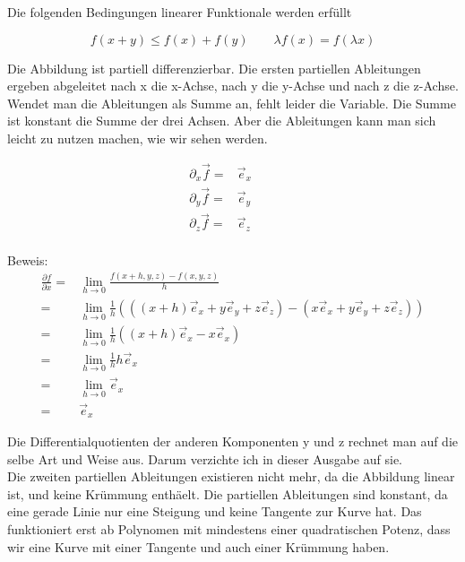 \documentclass[a4paper]{article}
\begin{document}
Die folgenden Bedingungen linearer Funktionale werden erf\"ullt

\begin{displaymath}
    f(x + y) \leq f(x) + f(y)\qquad\lambda f(x) = f(\lambda x)
\end{displaymath}

Die Abbildung ist partiell differenzierbar. Die ersten partiellen Ableitungen ergeben abgeleitet nach x die x-Achse, nach y die y-Achse und nach z die z-Achse. Wendet man die Ableitungen als Summe an, fehlt leider die Variable. Die Summe ist konstant die Summe der drei Achsen. Aber die Ableitungen kann man sich leicht zu nutzen machen, wie wir sehen werden.


\begin{displaymath}
\begin{align}
\partial_{x}\vec{f} =& \vec{e}_{x}\qquad\\
\partial_{y}\vec{f} =& \vec{e}_{y}\qquad\\
\partial_{z}\vec{f} =& \vec{e}_{z}\qquad\\
\end{align}
\end{displaymath}

Beweis:\\

\begin{displaymath}
\begin{align}
    \frac{\partial f}{\partial x} =& \lim_{h\rightarrow 0}\frac{f(x+h,y,z)-f(x,y,z)}{h}\\
    =& \lim_{h\rightarrow 0}\frac{1}{h}(((x+h)\vec{e}_x + y\vec{e}_y + z\vec{e}_z) - (x\vec{e}_x + y\vec{e}_y + z\vec{e}_z))\\
    =& \lim_{h\rightarrow 0}\frac{1}{h}((x+h)\vec{e}_x - x\vec{e}_x) \\
    =& \lim_{h\rightarrow 0}\frac{1}{h}h\vec{e}_x\\
    =& \lim_{h\rightarrow 0}\vec{e}_x\\
    =& \vec{e}_x
\end{align}
\end{displaymath}

Die Differentialquotienten der anderen Komponenten y und z rechnet man auf die selbe Art und Weise aus. Darum verzichte ich in dieser Ausgabe auf sie.\\

Die zweiten partiellen Ableitungen existieren nicht mehr, da die Abbildung linear ist, und keine Kr\"ummung enth\"aelt. Die partiellen Ableitungen sind konstant, da eine gerade Linie nur eine Steigung und keine Tangente zur Kurve hat. Das funktioniert erst ab Polynomen mit mindestens einer quadratischen Potenz, dass wir eine Kurve mit einer Tangente und auch einer Kr\"ummung haben.\\
\end{document}
